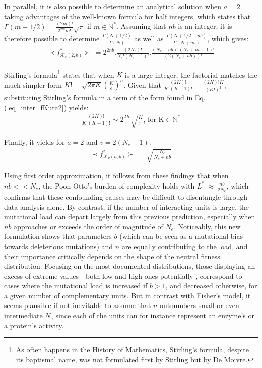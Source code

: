 In parallel, it is also possible to determine an analytical solution when $a=2$ taking advantages of the well-known formula for half integers, which states that $\Gamma(m+1/2)=\frac{(2m)!}{2^{2m}m!}\sqrt{\pi}$ if $m \in \mathbb{N}^*$. Assuming that $nb$ is an integer, it is therefore possible to determine $\frac{\Gamma(N+1/2)}{\Gamma(N)}$ as well as $\frac{\Gamma(N+1/2+nb)}{\Gamma(N+nb)}$, which gives:
\begin{align}
    \prec f^*_{\mathcal{K}_v(2,b)}\succ~=2^{2nb}.\frac{(2N_e)!}{N_e!(N_e-1)!}.\frac{(N_e+nb)!(N_e+nb-1)!}{(2(N_e+nb))!}
    \label{eq_inter_fKura2}
\end{align}

Stirling's formula\footnote{As often happens in the History of Mathematics, Stirling's formula, despite its baptismal name, was not formulated first by Stirling but by De Moivre.} \citep{Dutka91} states that when $K$ is a large integer, the factorial matches the much simpler form $K!=\sqrt{2\pi K}(\frac{K}{e})^{n}$. Given that $\frac{(2K)!}{K!(K-1)!}=\frac{(2K)!K}{(K!)^2}$, substituting Stirling's formula in a term of the form found in Eq.(\ref{eq_inter_fKura2}) yields:
\begin{align*}
    \frac{(2K)!}{K!(K-1)!}\sim 2^{2K}\sqrt{\frac{K}{\pi}}\text{, for K} \in \mathbb{N}^*
\end{align*}

Finally, it yields for $a=2$ and $v=2(N_e-1)$:
\begin{align}
    \prec f^*_{\mathcal{K}_v(a,b)}\succ~=\sqrt{\frac{N_e}{N_e+nb}}
\end{align}

Using first order approximation, it follows from these findings that when $nb<<N_e$, the Poon-Otto's burden of complexity holds with $L^* ~\approx~ \frac{nb}{2N_e}$, which confirms that these confounding causes may be difficult to disentangle through data analysis alone. By contrast, if the number of interacting units is large, the mutational load can depart largely from this previous prediction, especially when $nb$ approaches or exceeds the order of magnitude of $N_e$. Noticeably, this new formulation shows that parameters $b$ (which can be seen as a mutational bias towards deleterious mutations) and $n$ are equally contributing to the load, and their importance critically depends on the shape of the neutral fitness distribution. Focusing on the most documented distributions, those displaying an excess of extreme values - both low and high ones potentially-, correspond to cases where the mutational load is increased if $b>1$, and decreased otherwise, for a given number of complementary units. But in contrast with Fisher's model, it seems plausible if not inevitable to assume that $n$ outnumbers small or even intermediate $N_e$ since each of the units can for instance represent an enzyme's or a protein's activity. 


